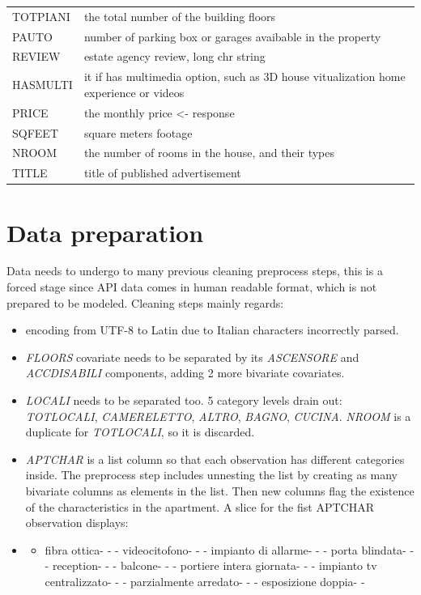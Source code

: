 \documentclass[
  12pt,
  a4paper,
  oneside]{book}
\providecommand{\tightlist}{%
  \setlength{\itemsep}{0pt}\setlength{\parskip}{0pt}}
\theoremstyle{definition}
\theoremstyle{definition}
\theoremstyle{definition}
\theoremstyle{remark}
\begin{document}
\begin{longtable}{ll}
\addlinespace
TOTPIANI & the total number of the building floors\\
PAUTO & number of parking box or garages avaibable in the property\\
REVIEW & estate agency review, long chr string\\
HASMULTI & it if has multimedia option, such as 3D house vitualization home experience or videos\\
PRICE & the monthly price <- response\\
\addlinespace
SQFEET & square meters footage\\
NROOM & the number of rooms in the house, and their types\\
TITLE & title of published advertisement\\
\bottomrule
\end{longtable}

\hypertarget{prep}{%
\section{Data preparation}\label{prep}}

Data needs to undergo to many previous cleaning preprocess steps, this is a forced stage since API data comes in human readable format, which is not prepared to be modeled. Cleaning steps mainly regards:

\begin{itemize}
\item
  encoding from UTF-8 to Latin due to Italian characters incorrectly parsed.
\item
  \emph{FLOORS} covariate needs to be separated by its \emph{ASCENSORE} and \emph{ACCDISABILI} components, adding 2 more bivariate covariates.
\item
  \emph{LOCALI} needs to be separated too. 5 category levels drain out: \emph{TOTLOCALI}, \emph{CAMERELETTO}, \emph{ALTRO}, \emph{BAGNO}, \emph{CUCINA}. \emph{NROOM} is a duplicate for \emph{TOTLOCALI}, so it is discarded.
\item
  \emph{APTCHAR} is a list column so that each observation has different categories inside. The preprocess step includes unnesting the list by creating as many bivariate columns as elements in the list. Then new columns flag the existence of the characteristics in the apartment. A slice for the fist APTCHAR observation displays:
\item
  \begin{itemize}
  \tightlist
  \item
    fibra ottica- - - videocitofono- - - impianto di allarme- - - porta blindata- - - reception- - - balcone- - - portiere intera giornata- - - impianto tv centralizzato- - - parzialmente arredato- - - esposizione doppia- -
  \end{itemize}
\end{itemize}
\end{document}
